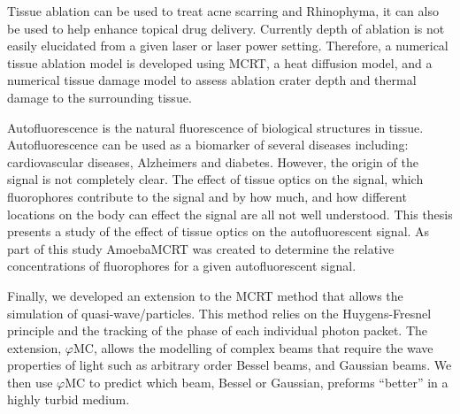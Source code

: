 \documentclass[10pt,a4paper,twoside]{book}
\begin{document}
Tissue ablation can be used to treat acne scarring and Rhinophyma, it can also be used to help enhance topical drug delivery.
Currently depth of ablation is not easily elucidated from a given laser or laser power setting.
Therefore, a numerical tissue ablation model is developed using MCRT, a heat diffusion model, and a numerical tissue damage model to assess ablation crater depth and thermal damage to the surrounding tissue.

Autofluorescence is the natural fluorescence of biological structures in tissue.
Autofluorescence can be used as a biomarker of several diseases including: cardiovascular diseases, Alzheimers and diabetes.
However, the origin of the signal is not completely clear.
The effect of tissue optics on the signal, which fluorophores contribute to the signal and by how much, and how different locations on the body can effect the signal are all not well understood.
This thesis presents a study of the effect of tissue optics on the autofluorescent signal.
As part of this study AmoebaMCRT was created to determine the relative concentrations of fluorophores for a given autofluorescent signal.

Finally, we developed an extension to the MCRT method that allows the simulation of quasi-wave/particles.
This method relies on the Huygens-Fresnel principle and the tracking of the phase of each individual photon packet.
The extension, $\varphi$MC, allows the modelling of complex beams that require the wave properties of light such as arbitrary order Bessel beams, and Gaussian beams.
We then use $\varphi$MC to predict which beam, Bessel or Gaussian, preforms ``better'' in a highly turbid medium.



\end{document}
